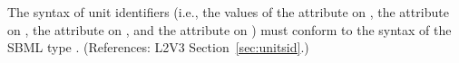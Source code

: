 The syntax of unit identifiers (i.e., the values of the 
attribute on \UnitDefinition, the  attribute on \Compartment,
the  attribute on \Parameter, and the 
attribute on \Species) must conform to the syntax of the SBML type
.  (References: L2V3 Section~\ref{sec:unitsid}.)
